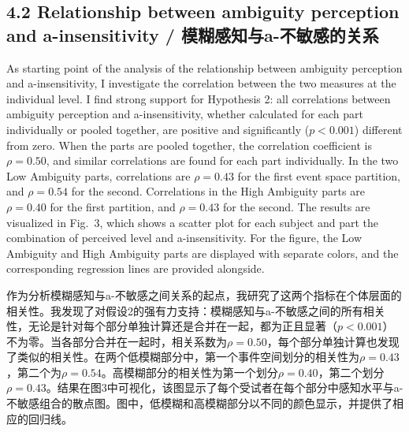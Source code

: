 \documentclass[12pt,a4paper]{article}
\newenvironment{original}
  {\par\medskip\noindent\color{black}\ignorespaces}
  {\par\medskip}
\newenvironment{translation}
  {\par\noindent\color{transblue}\ignorespaces}
  {\par\medskip\medskip}
\begin{document}
\subsection{4.2 Relationship between ambiguity perception and a-insensitivity / 模糊感知与a-不敏感的关系}

\begin{original}
As starting point of the analysis of the relationship between ambiguity perception and a-insensitivity, I investigate the correlation between the two measures at the individual level. I find strong support for Hypothesis 2: all correlations between ambiguity perception and a-insensitivity, whether calculated for each part individually or pooled together, are positive and significantly ($p < 0.001$) different from zero. When the parts are pooled together, the correlation coefficient is $\rho = 0.50$, and similar correlations are found for each part individually. In the two Low Ambiguity parts, correlations are $\rho = 0.43$ for the first event space partition, and $\rho = 0.54$ for the second. Correlations in the High Ambiguity parts are $\rho = 0.40$ for the first partition, and $\rho = 0.43$ for the second. The results are visualized in Fig.\ 3, which shows a scatter plot for each subject and part the combination of perceived level and a-insensitivity. For the figure, the Low Ambiguity and High Ambiguity parts are displayed with separate colors, and the corresponding regression lines are provided alongside.
\end{original}

\begin{translation}
作为分析模糊感知与a-不敏感之间关系的起点，我研究了这两个指标在个体层面的相关性。我发现了对假设2的强有力支持：模糊感知与a-不敏感之间的所有相关性，无论是针对每个部分单独计算还是合并在一起，都为正且显著（$p < 0.001$）不为零。当各部分合并在一起时，相关系数为$\rho = 0.50$，每个部分单独计算也发现了类似的相关性。在两个低模糊部分中，第一个事件空间划分的相关性为$\rho = 0.43$，第二个为$\rho = 0.54$。高模糊部分的相关性为第一个划分$\rho = 0.40$，第二个划分$\rho = 0.43$。结果在图3中可视化，该图显示了每个受试者在每个部分中感知水平与a-不敏感组合的散点图。图中，低模糊和高模糊部分以不同的颜色显示，并提供了相应的回归线。
\end{translation}
\end{document}

